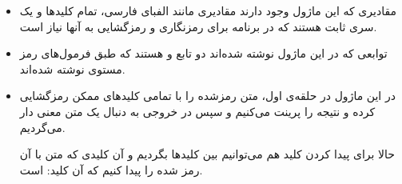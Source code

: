 \documentclass{article}
\begin{document}
\begin{itemize}
\item 
{}

مقادیری که این ماژول وجود دارند مقادیری مانند الفبای فارسی، تمام کلید‌ها و یک سری ثابت هستند که در برنامه برای رمزنگاری و رمزگشایی به آنها نیاز است.

\item {}

توابعی که در این ماژول نوشته شده‌اند دو تابع 
و
هستند که طبق فرمول‌های رمز مستوی نوشته شده‌اند.

\item {}

در این ماژول در حلقه‌ی 
اول، متن رمزشده را با تمامی کلید‌های ممکن رمزگشایی کرده و نتیجه را پرینت می‌کنیم و سپس در خروجی به دنبال یک متن معنی دار می‌گردیم.

حالا برای پیدا کردن کلید هم می‌توانیم بین کلید‌ها بگردیم و آن کلیدی که متن با آن رمز شده را پیدا کنیم که آن کلید:
است.
\end{itemize}
\end{document}
